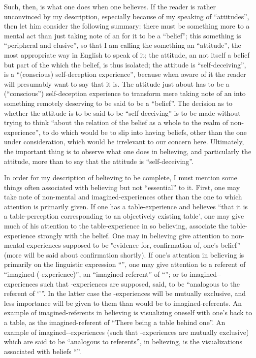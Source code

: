 Such, then, is what one does when one believes. If the reader is rather unconvinced by my description, especially because of my speaking of \enquote{attitudes}, then let him consider the following summary: there must be something more to a mental act than just taking note of an  for it to be a \enquote{belief}; this something is \enquote{peripheral and elusive}, so that I am calling the something an \enquote{attitude}, the most appropriate way in English to speak of it; the attitude, an  not itself a belief but part of the  which  the belief, is thus isolated; the attitude is \enquote{self-deceiving}, is a \enquote{(conscious) self-deception experience}, because when aware of it the reader will presumably want to say that it is. The attitude just about has to be a (\enquote{conscious}) self-deception experience to transform mere taking note of an  into something remotely deserving to be said to be a \enquote{belief}. The decision as to whether the attitude is to be said to be \enquote{self-deceiving} is to be made without trying to think \enquote{about the relation of the belief as a whole to the realm of non-experience}, to do which would be to slip into having beliefs, other than the one under consideration, which would be irrelevant to our concern here. Ultimately, the important thing is to observe what one does in believing, and particularly the attitude, more than to say that the attitude is \enquote{self-deceiving}. 

In order for my description of believing to be complete, I must mention some things often associated with believing but not \enquote{essential} to it. First, one may take note of non-mental and imagined-experiences other than the one to which attention is primarily given. If one has a table-experience and believes \enquote{that it is a table-perception corresponding to an objectively existing table', one may give much of his attention to the table-experience in so believing, associate the table-experience strongly with the belief. One may in believing give attention to non-mental experiences supposed to be "evidence for, confirmation of, one's belief} (more will be said about confirmation shortly). If one's attention in believing is primarily on the linguistic expression \enquote{\x}, one may give attention to a referent of \enquote{imagined-\x(-experience)}, an \enquote{imagined-referent} of \enquote{\x}; or to imagined-\y-experiences such that \y-experiences are supposed, said, to be \enquote{analogous to the referent of \enquote{\x}}. In the latter case the \y-experiences will be mutually exclusive, and less importance will be given to them than would be to imagined-referents. An example of imagined-referents in believing is visualizing oneself with one's back to a table, as the imagined-referent of \enquote{There being a table behind one}. An example of imagined-\y-experiences (such that \y-experiences are mutually exclusive) which are said to be \enquote{analogous to referents}, in believing, is the visualizations associated with beliefs \enquote{}. 

